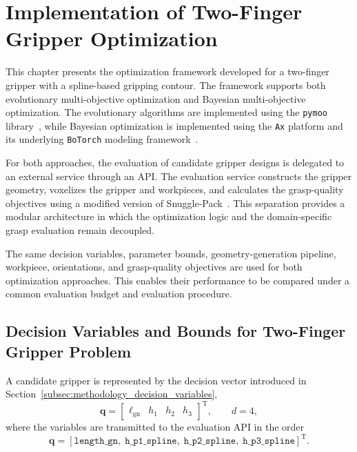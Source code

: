 \section{Implementation of Two-Finger Gripper Optimization}
\label{sec:two_finger_gripper_optimization}

This chapter presents the optimization framework developed for a two-finger gripper with a
spline-based gripping contour. The framework supports both evolutionary multi-objective optimization
and Bayesian multi-objective optimization. The evolutionary algorithms are implemented using the
\texttt{pymoo} library~\cite{pymoo}, while Bayesian optimization is implemented using the
\texttt{Ax} platform and its underlying \texttt{BoTorch} modeling
framework~\cite{olson2025ax,botorch}.

For both approaches, the evaluation of candidate gripper designs is delegated to an external service
through an API. The evaluation service constructs the gripper geometry, voxelizes the gripper and
workpieces, and calculates the grasp-quality objectives using a modified version of
Snuggle-Pack~\cite{snuggle_pack}. This separation provides a modular architecture in which the
optimization logic and the domain-specific grasp evaluation remain decoupled.

The same decision variables, parameter bounds, geometry-generation pipeline, workpiece,
orientations, and grasp-quality objectives are used for both optimization approaches. This enables
their performance to be compared under a common evaluation budget and evaluation procedure.

\subsection{Decision Variables and Bounds for Two-Finger Gripper Problem}
\label{sec:two_finger_decision_variables}

A candidate gripper is represented by the decision vector introduced in
Section~\ref{subsec:methodology_decision_variables},
\begin{equation}
    \mathbf{q}
    =
    \begin{bmatrix}
        \ell_{\mathrm{gn}} &
        h_1 &
        h_2 &
        h_3
    \end{bmatrix}^{\mathrm{T}},
    \qquad d = 4,
\end{equation}
where the variables are transmitted to the evaluation API in the order
\begin{equation}
    \mathbf{q}
    =
    [
        \texttt{length\_gn},\;
        \texttt{h\_p1\_spline},\;
        \texttt{h\_p2\_spline},\;
        \texttt{h\_p3\_spline}
    ]^{\mathrm{T}}.
\end{equation}

